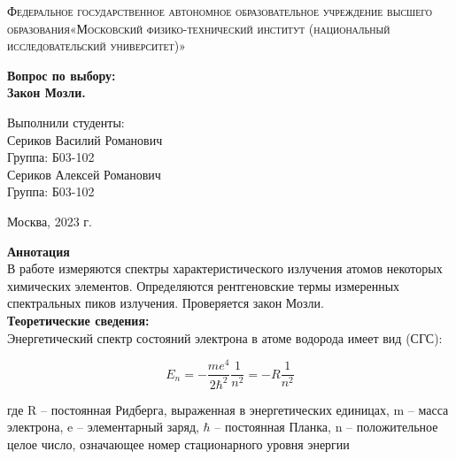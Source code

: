 \documentclass[a4paper, 12pt]{article}%
\begin{document}
	\begin{titlepage}
		\begin{center}
			\textsc{Федеральное государственное автономное образовательное учреждение высшего образования«Московский физико-технический институт (национальный исследовательский университет)»\\[5mm]
			}
			
			\vfill
			
			\textbf{Вопрос по выбору: \\[3mm]
				Закон Мозли.
				\\[50mm]
			}
			
		\end{center}
		
		\hfill
		\begin{minipage}{.5\textwidth}
			Выполнили студенты:\\[2mm]
			Сериков Василий Романович\\[2mm]
			Группа: Б03-102\\[5mm]
			Сериков Алексей Романович\\[2mm]
			Группа: Б03-102\\[5mm]
			
		\end{minipage}
		\vfill
		\begin{center}
			Москва, 2023 г.
		\end{center}
		
	\end{titlepage}
	
	\newpage
	\textbf{Аннотация}\\
	
	В работе измеряются спектры характеристического излучения
	атомов некоторых химических элементов. Определяются рентгеновские
	термы измеренных спектральных пиков излучения. Проверяется закон Мозли.\\
	
	\textbf{Теоретические сведения: }\\
	
	Энергетический спектр состояний электрона в
	атоме водорода имеет вид (СГС):
	
	\begin{equation}
		E_n=-\frac{m e^4}{2 \hbar^2} \frac{1}{n^2}=-R \frac{1}{n^2}
	\end{equation}
	
	где R – постоянная Ридберга, выраженная в энергетических единицах, m – масса электрона, e – элементарный заряд, $\hbar$ – постоянная
	Планка, n – положительное целое число, означающее номер стационарного уровня энергии
	
\end{document}
